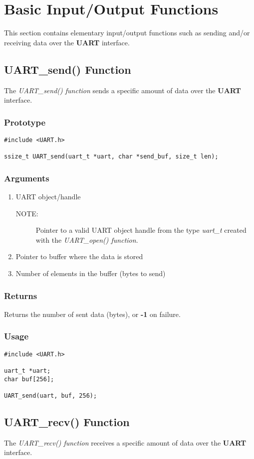 \documentclass{report}
\begin{document}
\section{Basic Input/Output Functions}
This section contains elementary input/output functions such as
sending and/or receiving data over the \textbf{UART} interface.
\subsection{UART\_send() Function}
The \textit{UART\_send() function} sends a specific amount of
data over the \textbf{UART} interface.
\subsubsection*{Prototype}
\begin{lstlisting}
#include <UART.h>

ssize_t UART_send(uart_t *uart, char *send_buf, size_t len);
\end{lstlisting}
\subsubsection*{Arguments}
\begin{enumerate}
\item UART object/handle
\begin{description}
\item[NOTE:] Pointer to a valid UART object handle from the type \textit{uart\_t}
created with the \textit{UART\_open() function}.
\end{description}
\item Pointer to buffer where the data is stored
\item Number of elements in the buffer (bytes to send)
\end{enumerate}
\subsubsection*{Returns}
Returns the number of sent data (bytes), or \textbf{-1} on failure.
\subsubsection*{Usage}
\begin{lstlisting}
#include <UART.h>

uart_t *uart;
char buf[256];

UART_send(uart, buf, 256);
\end{lstlisting}
\subsection{UART\_recv() Function}
The \textit{UART\_recv() function} receives a specific amount of
data over the \textbf{UART} interface.
\end{document}
